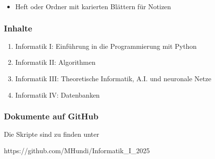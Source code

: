 \documentclass[
  11pt,
  a4paper,
  DIV=11,
  numbers=noendperiod]{scrartcl}
\providecommand{\tightlist}{%
  \setlength{\itemsep}{0pt}\setlength{\parskip}{0pt}}\usepackage{longtable,booktabs,array}
\begin{document}
\begin{itemize}
\tightlist
\item
  Heft oder Ordner mit karierten Blättern für Notizen
\end{itemize}

\subsubsection{Inhalte}\label{inhalte}

\begin{enumerate}
\def\labelenumi{\arabic{enumi}.}
\tightlist
\item
  Informatik I: Einführung in die Programmierung mit Python
\item
  Informatik II: Algorithmen
\item
  Informatik III: Theoretische Informatik, A.I. und neuronale Netze
\item
  Informatik IV: Datenbanken
\end{enumerate}

\subsubsection{Dokumente auf GitHub}\label{dokumente-auf-github}

Die Skripte sind zu finden unter

https://github.com/MHundi/Informatik\_I\_2025
\end{document}
